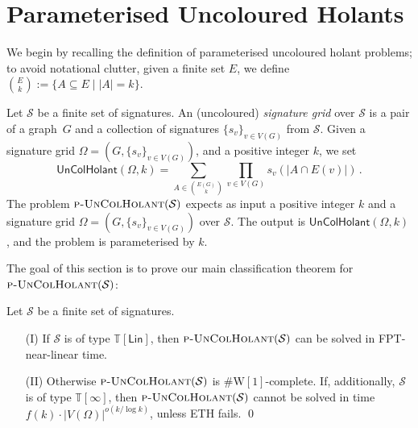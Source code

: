 \documentclass[authorcolumns,numberwithinsect]{no-lipics-v2022}
\newcommand{\W}{\mathrm{W}}
\begin{document}
\section{Parameterised Uncoloured Holants}\label{sec:uncoloured}
We begin by recalling the definition of parameterised uncoloured holant problems; to avoid notational clutter, given a finite set $E$, we define $\binom{E}{k}:=\{A \subseteq E \mid |A| = k\}$.
\begin{definition}
    Let $\mathcal{S}$ be a finite set of signatures.
    An (uncoloured) \emph{signature grid} over $\mathcal{S}$ is a pair of a graph~$G$ and a collection of signatures $\{s_v\}_{v\in V(G)}$ from $\mathcal{S}$. Given a signature grid $\Omega=(G,\{s_v\}_{v\in V(G)})$, and a positive integer $k$, we set
    \[ \mathsf{UnColHolant}(\Omega,k) = \sum_{A \in \binom{E(G)}{k}} \prod_{v\in V(G)} s_v(|A \cap E(v)|) \,.\]
    The problem $\text{\sc{p-UnColHolant}}(\mathcal{S})$ expects as input a positive integer $k$ and a signature grid $\Omega=(G,\{s_v\}_{v\in V(G)})$ over $\mathcal{S}$. The output is $\mathsf{UnColHolant}(\Omega,k)$, and the problem is parameterised by $k$. 
\end{definition}

The goal of this section is to prove our main classification theorem for $\text{\sc{p-UnColHolant}}(\mathcal{S})$:

\begin{theorem}\label{thm:main_uncol_restate}
    Let $\mathcal{S}$ be a finite set of signatures. 
    \begin{itemize}
        \item[(I)] If $\mathcal{S}$ is of type $\mathbb{T}[\mathsf{Lin}]$, then $\text{\sc{p-UnColHolant}}(\mathcal{S})$ can be solved in FPT-near-linear time.
        \item[(II)] Otherwise $\text{\sc{p-UnColHolant}}(\mathcal{S})$ is $\#\W[1]$-complete. If, additionally, $\mathcal{S}$ is of type $\mathbb{T}[\infty]$, then $\text{\sc{p-UnColHolant}}(\mathcal{S})$ cannot be solved in time $f(k)\cdot |V(\Omega)|^{o(k/\log k)}$, unless ETH fails. \qed
    \end{itemize}
\end{theorem}
\end{document}
